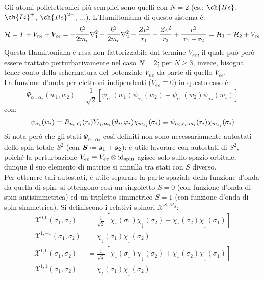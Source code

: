 Gli atomi polielettronici più semplici sono quelli con $ N = 2 $ (es.: $ \ch{He} $, $ \ch{Li}^+ $, $ \ch{Be}^{2+} $, ...). L'Hamiltoniana di questo sistema è:
\begin{equation*}
	\mathcal{H} = T + V_{ne} + V_{ee} = - \frac{\hbar^2}{2m_e} \nabla^2_1 - \frac{\hbar^2}{2m_e} \nabla^2_2 - \frac{Ze^2}{r_1} - \frac{Ze^2}{r_2} + \frac{e^2}{\left\lvert\mathbf{r}_1 - \mathbf{r}_2\right\rvert} = \mathcal{H}_1 + \mathcal{H}_2 + V_{ee}
\end{equation*}
Questa Hamiltoniana è resa non-fattorizzabile dal termine $ V_{ee} $, il quale può però essere trattato perturbativamente nel caso $ N = 2 $; per $ N \ge 3 $, invece, bisogna tener conto della schermatura del potenziale $ V_{ne} $ da parte di quello $ V_{ee} $. \\
La funzione d'onda per elettroni indipendenti ($ V_{ee} \equiv 0 $) in questo caso è:
\begin{equation*}
	\Psi_{\alpha_1 , \alpha_2}(w_1 , w_2) = \frac{1}{\sqrt{2}} \left[ \psi_{\alpha_1}(w_1) \psi_{\alpha_2}(w_2) - \psi_{\alpha_1}(w_2) \psi_{\alpha_2}(w_1) \right]
\end{equation*}
con:
\begin{equation*}
	\psi_{\alpha_i}(w_i) = R_{n_i, \ell_i}(r_i) Y_{\ell_i, m_i}(\vartheta_i, \varphi_i) \chi_{m_{s_i}}(\sigma_i) \equiv \psi_{n_i, \ell_i, m_i}(\mathbf{r}_i) \chi_{m_{s_i}}(\sigma_i)
\end{equation*}
Si nota però che gli stati $ \Psi_{\alpha_1, \alpha_2} $ così definiti non sono necessariamente autostati dello spin totale $ S^2 $ (con $ \bs{S} \defeq \bs{s}_1 + \bs{s}_2 $): è utile lavorare con autostati di $ S^2 $, poiché la perturbazione $ V_{ee} \equiv V_{ee} \otimes \operatorname{id}_\text{spin} $ agisce solo sullo spazio orbitale, dunque il suo elemento di matrice si annulla tra stati con $ S $ diverso. \\
Per ottenere tali autostati, è utile separare la parte spaziale della funzione d'onda da quella di spin: si ottengono così un singoletto $ S = 0 $ (con funzione d'onda di spin antisimmetrica) ed un tripletto simmetrico $ S = 1 $ (con funzione d'onda di spin simmetrica). Si definiscono i relativi spinori $ \mathcal{X}^{S,M_S} $:
\begin{align*}
	\mathcal{X}^{0,0}(\sigma_1, \sigma_2) &= \frac{1}{\sqrt{2}} \left[ \chi_\uparrow(\sigma_1) \chi_\downarrow(\sigma_2) - \chi_\uparrow(\sigma_2) \chi_\downarrow(\sigma_1) \right] \\
	\mathcal{X}^{1,-1}(\sigma_1, \sigma_2) &= \chi_\downarrow(\sigma_1) \chi_\downarrow(\sigma_2) \\
	\mathcal{X}^{1,0}(\sigma_1, \sigma_2) &= \frac{1}{\sqrt{2}} \left[ \chi_\uparrow(\sigma_1) \chi_\downarrow(\sigma_2) + \chi_\uparrow(\sigma_2) \chi_\downarrow(\sigma_1) \right] \\
	\mathcal{X}^{1,1}(\sigma_1, \sigma_2) &= \chi_\uparrow(\sigma_1) \chi_\downarrow(\sigma_2)
\end{align*}
